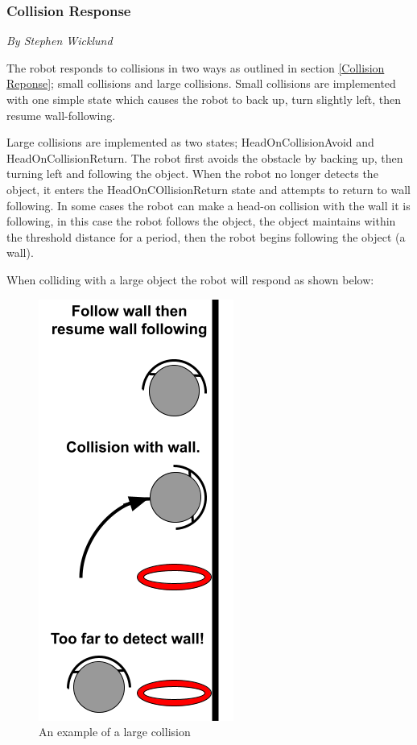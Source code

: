 \documentclass[12pt]{report}
\newcommand{\sectionAuthor}[1]{{\small\vspace{-1em}\textit{#1}}\bigskip\par}
\begin{document}
\subsubsection{Collision Response}
\sectionAuthor{By Stephen Wicklund}
The robot responds to collisions in two ways as outlined in section \ref{Collision Reponse}; small collisions and large collisions. Small collisions are implemented with one simple state which causes the robot to back up, turn slightly left, then resume wall-following. 

Large collisions are implemented as two states; HeadOnCollisionAvoid and HeadOnCollisionReturn. The robot first avoids the obstacle by backing up, then turning left and following the object. When the robot no longer detects the object, it enters the HeadOnCOllisionReturn state and attempts to return to wall following. In some cases the robot can make a head-on collision with the wall it is following, in this case the robot follows the object, the object maintains within the threshold distance for a period, then the robot begins following the object (a wall).

When colliding with a large object the robot will respond as shown below:
\begin{figure}[H]
    \centering
    \includegraphics[scale=0.5]{images/BigCollisionExample.png}
    \caption{An example of a large collision}
    \label{Large Collision Issues}
\end{figure}
\end{document}
